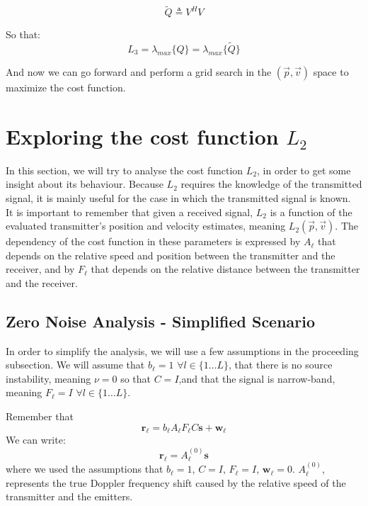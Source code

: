 \documentclass[10pt,a4paper]{report}
\begin{document}
\begin{equation}
\tilde{Q}  \triangleq V^H V                                                                               
\end{equation}

So that:
\begin{equation}
L_3=\lambda_{max}\{Q\} = \lambda_{max}\{\tilde{Q}\} 
\end{equation}

And now we can go forward and perform a grid search in the $(\vec{p},\vec{v})$ space to maximize the cost function.

\chapter{Exploring the cost function $L_2$}
In this section, we will try to analyse the cost function $L_2$, in order to get
some insight about its behaviour.
Because $L_2$ requires the knowledge of the transmitted signal, it is mainly useful for
the case in which the transmitted signal is known.
\\
It is important to remember that given a received signal, $L_2$ is a function
of the evaluated transmitter's position and velocity estimates, meaning $L_2(\vec{p},\vec{v})$.
The dependency of the cost function in these parameters is expressed by $A_\ell$ that depends
on the relative speed and position between the transmitter and the receiver, and by $F_\ell$ that depends
on the relative distance between the transmitter and the receiver.

\section{Zero Noise Analysis - Simplified Scenario}

In order to simplify the analysis, we will use a few assumptions in the proceeding subsection.
We will assume that $b_\ell=1$ $\forall l\in\{1\dots L\}$, that there is no source instability, meaning $\nu=0$ so that $C=I$,and that the signal is narrow-band, meaning $F_\ell=I$ $\forall l\in\{1\dots L\}$.

Remember that $$\mathbf{r_\ell}=b_\ell A_\ell F_\ell C \mathbf{s} + \mathbf{w_\ell}$$
We can write:
\begin{equation}
\mathbf{r_\ell}= A^{(0)}_\ell \mathbf{s}
\end{equation}
where we used the assumptions that $b_\ell=1$, $C=I$, $F_\ell=I$, $\mathbf{w}_\ell=0$. $A^{(0)}_\ell$, represents the
true Doppler frequency shift caused by the relative speed of the transmitter and the emitters.
\end{document}
